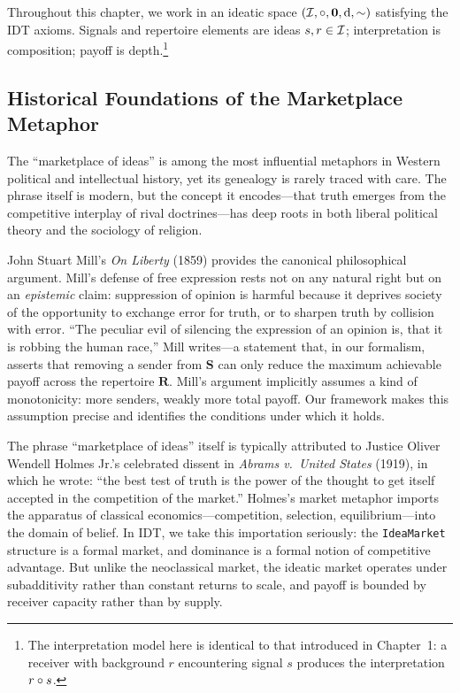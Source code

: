 Throughout this chapter, we work in an ideatic space $(\mathcal{I}, \circ, \mathbf{0}, \operatorname{d}, \sim)$
satisfying the IDT axioms.  Signals and repertoire elements are ideas
$s, r \in \mathcal{I}$; interpretation is composition; payoff is depth.\footnote{The
interpretation model here is identical to that introduced in Chapter~1:
a receiver with background $r$ encountering signal $s$ produces the
interpretation $r \circ s$.}

\subsection{Historical Foundations of the Marketplace Metaphor}

The ``marketplace of ideas'' is among the most influential metaphors in Western
political and intellectual history, yet its genealogy is rarely traced with
care.  The phrase itself is modern, but the concept it encodes---that
truth emerges from the competitive interplay of rival doctrines---has deep
roots in both liberal political theory and the sociology of religion.

John Stuart Mill's \textit{On Liberty} (1859) provides the canonical
philosophical argument.  Mill's defense of free expression rests not on
any natural right but on an \emph{epistemic} claim: suppression of opinion
is harmful because it deprives society of the opportunity to exchange
error for truth, or to sharpen truth by collision with error.  ``The
peculiar evil of silencing the expression of an opinion is, that it is
robbing the human race,'' Mill writes---a statement that, in our
formalism, asserts that removing a sender from $\mathbf{S}$ can only
reduce the maximum achievable payoff across the repertoire $\mathbf{R}$.
Mill's argument implicitly assumes a kind of monotonicity: more senders,
weakly more total payoff.  Our framework makes this assumption precise
and identifies the conditions under which it holds.

The phrase ``marketplace of ideas'' itself is typically attributed to
Justice Oliver Wendell Holmes Jr.'s celebrated dissent in
\textit{Abrams v.\ United States} (1919), in which he wrote: ``the best
test of truth is the power of the thought to get itself accepted in the
competition of the market.''  Holmes's market metaphor imports the
apparatus of classical economics---competition, selection, equilibrium---into
the domain of belief.  In IDT, we take this importation seriously: the
\texttt{IdeaMarket} structure is a formal market, and dominance is a formal
notion of competitive advantage.  But unlike the neoclassical market, the
ideatic market operates under subadditivity rather than constant returns to
scale, and payoff is bounded by receiver capacity rather than by supply.

